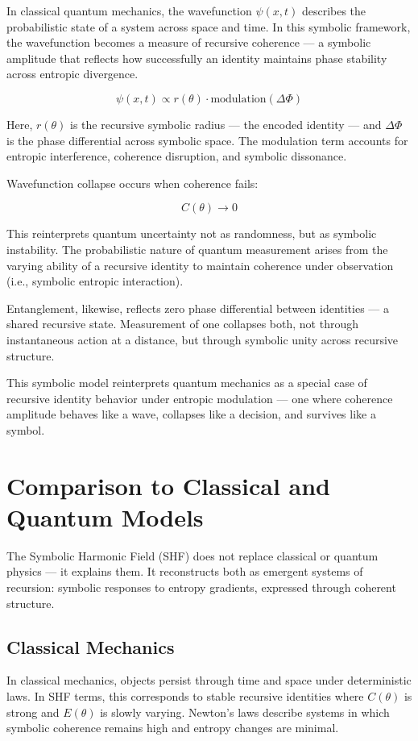 \documentclass[12pt]{article}
\begin{document}
In classical quantum mechanics, the wavefunction \(\psi(x,t)\) describes the probabilistic state of a system across space and time. In this symbolic framework, the wavefunction becomes a measure of recursive coherence — a symbolic amplitude that reflects how successfully an identity maintains phase stability across entropic divergence.

\[
\psi(x, t) \propto r(\theta) \cdot \text{modulation}(\Delta \Phi)
\]

Here, \(r(\theta)\) is the recursive symbolic radius — the encoded identity — and \(\Delta \Phi\) is the phase differential across symbolic space. The modulation term accounts for entropic interference, coherence disruption, and symbolic dissonance.

Wavefunction collapse occurs when coherence fails:

\[
C(\theta) \to 0
\]

This reinterprets quantum uncertainty not as randomness, but as symbolic instability. The probabilistic nature of quantum measurement arises from the varying ability of a recursive identity to maintain coherence under observation (i.e., symbolic entropic interaction).

Entanglement, likewise, reflects zero phase differential between identities — a shared recursive state. Measurement of one collapses both, not through instantaneous action at a distance, but through symbolic unity across recursive structure.

This symbolic model reinterprets quantum mechanics as a special case of recursive identity behavior under entropic modulation — one where coherence amplitude behaves like a wave, collapses like a decision, and survives like a symbol.

\section{Comparison to Classical and Quantum Models}

The Symbolic Harmonic Field (SHF) does not replace classical or quantum physics — it explains them. It reconstructs both as emergent systems of recursion: symbolic responses to entropy gradients, expressed through coherent structure.

\subsection*{Classical Mechanics}

In classical mechanics, objects persist through time and space under deterministic laws. In SHF terms, this corresponds to stable recursive identities where \(C(\theta)\) is strong and \(E(\theta)\) is slowly varying. Newton’s laws describe systems in which symbolic coherence remains high and entropy changes are minimal.
\end{document}
